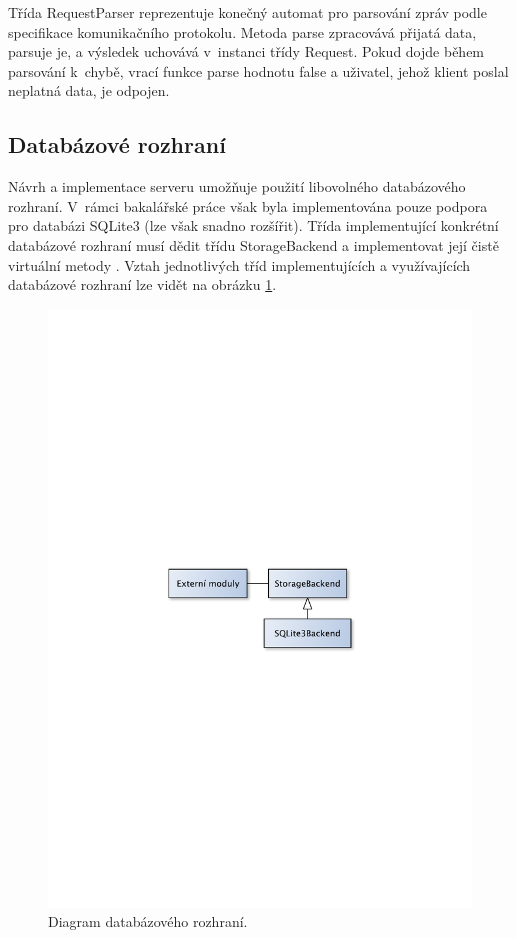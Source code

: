 Třída RequestParser reprezentuje konečný automat pro parsování zpráv podle specifikace komunikačního protokolu.
Metoda parse zpracovává přijatá data, parsuje je, a výsledek uchovává v~instanci třídy Request. Pokud dojde během parsování
k~chybě, vrací funkce parse hodnotu false a uživatel, jehož klient poslal
neplatná data, je odpojen.

\subsection{Databázové rozhraní}
\label{implementace_db}

Návrh a implementace serveru umožňuje použití libovolného databázového rozhraní.
V~rámci bakalářské práce však byla implementována 
pouze podpora pro databázi SQLite3 (lze však snadno rozšířit). Třída implementující konkrétní databázové rozhraní musí dědit třídu StorageBackend a implementovat
její čistě virtuální metody \cite{oop}. Vztah jednotlivých tříd implementujících a využívajících databázové rozhraní lze vidět
na obrázku \ref{fig:imp_databaze}.

\begin{figure}[h]
\centering
\includegraphics[trim=12cm 12cm 12cm 12cm, scale=0.7]{fig/imp_databaze}
\caption{Diagram databázového rozhraní.}
\label{fig:imp_databaze}
\end{figure}

